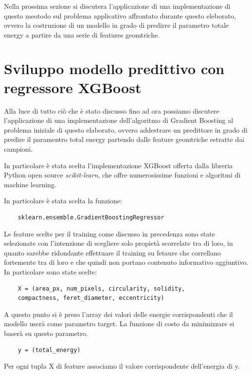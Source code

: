 \documentclass[12pt,a4paper,openright,twoside]{report}
\begin{document}
Nella prossima sezione si discutera l'applicazione di una implementazione di questo meotodo sul problema applicativo affrontato durante questo eleborato, ovvero la costruzione di un modello in grado di predirre il parametro totale energy a partire da una serie di features geomtriche. 


\section{Sviluppo modello predittivo con regressore XGBoost}
Alla luce di tutto ciò che è stato discusso fino ad ora possiamo discutere l'applicazione di una implementazione dell'algoritmo di Gradient Boosting al problema iniziale di questo elaborato, ovvero addestrare un predittore in grado di predire il paramentro total energy partendo dalle feature geomtriche estratte dai campioni. 

In particolare è stata scelta l'implementazione XGBoost offerta dalla libreria Python open source \emph{scikit-learn}, che offre numerosissime funzioni e algoritmi di machine learning.

In particolare è stata scelta la funzione: 
\begin{verbatim}
    sklearn.ensemble.GradientBoostingRegressor
\end{verbatim}

Le feature scelte per il training come discusso in precedenza sono state selezionate con l'intenzione di scegliere solo propietà scorrelate tra di loro, in quanto sarebbe ridondante effettuare il training su fetaure che correllano fortemente tra di loro e che quindi non portano contenuto informativo aggiuntivo. 
In particolare sono state scelte: 
\begin{verbatim}
    X = (area_px, num_pixels, circularity, solidity,
    compactness, feret_diameter, eccentricity)
\end{verbatim}
A questo punto si è preso l’array dei valori delle energie corrispondenti che il modello userà come parametro target. La funzione di costo da minimizzare si baserà su questo parametro. 
\begin{verbatim}
    y = (total_energy)
\end{verbatim}
Per ogni tupla X di feature associamo il valore corrispondente dell'energia di y.
\end{document}
